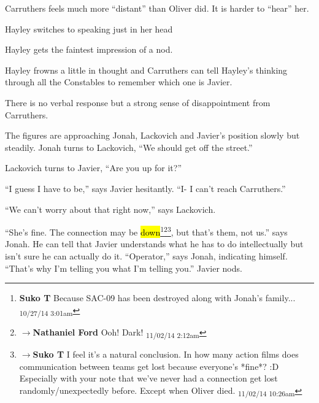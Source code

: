  Carruthers feels much more ``distant'' than Oliver did.  It is harder to ``hear'' her.

Hayley switches to speaking just in her head   

Hayley gets the faintest impression of a nod.   

Hayley frowns a little in thought and Carruthers can tell Hayley's thinking through all the Constables to remember which one is Javier.    

There is no verbal response but a strong sense of disappointment from Carruthers.



The figures are approaching Jonah, Lackovich and Javier's position slowly but steadily.  Jonah turns to Lackovich, ``We should get off the street.''

Lackovich turns to Javier, ``Are you up for it?''

``I guess I have to be,'' says Javier hesitantly. ``I- I can't reach Carruthers.''

``We can't worry about that right now,'' says Lackovich.

``She's fine.  The connection may be \hl{down}\footnote{\textbf{Suko T }Because SAC-09 has been destroyed along with Jonah's family... \textsubscript{10/27/14 3:01am}}\footnote{$\rightarrow$\textbf{Nathaniel Ford }Ooh! Dark! \textsubscript{11/02/14 2:12am}}\footnote{$\rightarrow$\textbf{Suko T }I feel it's a natural conclusion.  In how many action films does communication between teams get lost because everyone's *fine*? :D  Especially with your note that we've never had a connection get lost randomly/unexpectedly before.  Except when Oliver died. \textsubscript{11/02/14 10:26am}}, but that's them, not us.'' says Jonah.  He can tell that Javier understands what he has to do intellectually but isn't sure he can actually do it.  ``Operator,'' says Jonah, indicating himself. ``That's why I'm telling you what I'm telling you.''  Javier nods.



